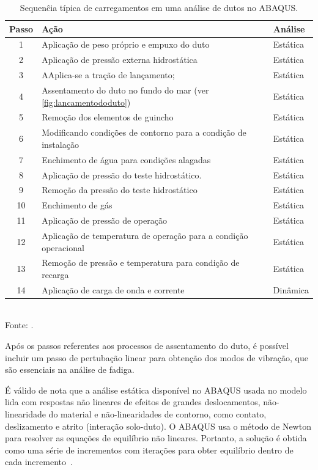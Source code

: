 \begin{table}[!ht]
\renewcommand{\arraystretch}{1.2}
\small
\centering
\caption{Sequenĉia típica de carregamentos em uma análise de dutos no ABAQUS.}\label{tab:load_steps}
\begin{tabular}{cll}
\toprule[1.5pt]

\textbf{Passo} & \textbf{Ação} & \textbf{Análise} \\
\midrule
1 & Aplicação de peso próprio e empuxo do duto & Estática \\
2 & Aplicação de pressão externa hidrostática & Estática \\
3 & AAplica-se a tração de lançamento; & Estática \\
4 & Assentamento do duto no fundo do mar (ver \autoref{fig:lancamentododuto}) & Estática \\
5 & Remoção dos elementos de guincho & Estática \\
6 & Modificando condições de contorno para a condição de instalação & Estática \\
7 & Enchimento de água para condições alagadas & Estática \\
8 & Aplicação de pressão do teste hidrostático. & Estática \\
9 & Remoção da pressão do teste hidrostático & Estática \\
10 & Enchimento de gás & Estática \\
11 & Aplicação de pressão de operação & Estática \\
12 & Aplicação de temperatura de operação para a condição operacional & Estática \\
13 & Remoção de pressão e temperatura para condição de recarga & Estática \\
14 & Aplicação de carga de onda e corrente & Dinâmica \\

\bottomrule[1.25pt]
\end{tabular}
\\[6pt]
Fonte: .
\end{table}

Após os passos referentes aos processos de assentamento do duto, é possível incluir um passo de pertubação linear para obtenção dos modos de vibração, que são essenciais na análise de fadiga.

É válido de nota que a análise estática disponível no ABAQUS usada no modelo lida com respostas não lineares de efeitos de grandes deslocamentos, não-linearidade do material e não-linearidades de contorno, como contato, deslizamento e atrito (interação solo-duto). O ABAQUS usa o método de Newton para resolver as equações de equilíbrio não lineares. Portanto, a solução é obtida como uma série de incrementos com iterações para obter equilíbrio dentro de cada incremento~\cite{SIMULIA2018}.

